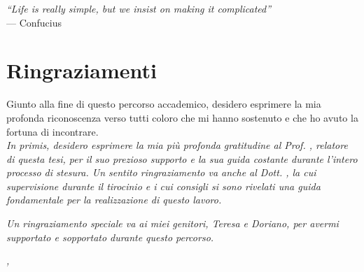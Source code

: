 \cleardoublepage
{}
{}

\begin{flushright}{
    \slshape
    ``Life is really simple, but we insist on making it complicated''} \\
    \medskip
    --- Confucius
\end{flushright}


\bigskip

\begingroup
\let\clearpage\relax
\let\cleardoublepage\relax
\let\cleardoublepage\relax

\chapter*{Ringraziamenti}

Giunto alla fine di questo percorso accademico, desidero esprimere la mia profonda riconoscenza verso tutti coloro che mi hanno sostenuto e che ho avuto la fortuna di incontrare.
\\
\noindent \textit{In primis, desidero esprimere la mia più profonda gratitudine al Prof. \myProf, relatore di questa tesi, per il suo prezioso supporto e la sua guida costante durante l'intero processo di stesura. Un sentito ringraziamento va anche al Dott. \myTutor, la cui supervisione durante il tirocinio e i cui consigli si sono rivelati una guida fondamentale per la realizzazione di questo lavoro.}\

\noindent \textit{Un ringraziamento speciale va ai miei genitori, Teresa e Doriano, per avermi supportato e sopportato durante questo percorso.}

\bigskip

\noindent\textit{\myLocation, \myTime}
\hfill \myName 

\endgroup
